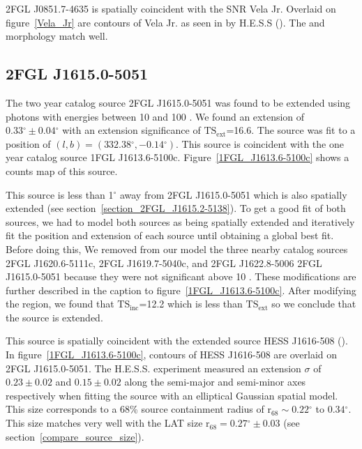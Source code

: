 \documentclass[12pt,preprint]{aastex}
\newcommand{\gev}{\text{GeV}\xspace}
\newcommand{\tev}{\text{TeV}\xspace}
\newcommand{\tsext}{{\ensuremath{\text{TS}_\text{ext}}}\xspace}
\newcommand{\tsinc}{\ensuremath{\text{TS}_\text{inc}}\xspace}
\newcommand{\rsixeight}{{\ensuremath{\text{r}_{68}}}\xspace}
\renewcommand{\deg}{\ensuremath{^\circ}\xspace}
\begin{document}
2FGL J0851.7-4635 is spatially coincident with the SNR Vela Jr.  Overlaid
on figure~\ref{Vela_Jr} are contours of Vela Jr. as seen in \tev by
H.E.S.S (\cite{vela_jr_hess}).  The \gev and \tev morphology match well.


\subsection{2FGL J1615.0-5051}
\label{section_2FGL_J1615.0-5051}


The two year catalog source 2FGL J1615.0-5051 was found to be
extended using photons with energies between 10 \gev and 100 \gev.
We found an extension of $0.33\deg\pm0.04\deg$ with an extension
significance of \tsext=16.6.  The source was fit to a position of
$(l,b)=(332.38\deg,-0.14\deg)$.  This source is coincident with the one
year catalog source 1FGL J1613.6-5100c.  Figure~\ref{1FGL_J1613.6-5100c}
shows a counts map of this source.

This source is less than 1\deg away from 2FGL J1615.0-5051 which is
also spatially extended (see section~\ref{section_2FGL_J1615.2-5138}).
To get a good fit of both sources, we had to model both sources as being
spatially extended and iteratively fit the position and extension of each
source until obtaining a global best fit.  Before doing this, We removed
from our model the three nearby catalog sources 2FGL J1620.6-5111c, 2FGL
J1619.7-5040c, and 2FGL J1622.8-5006 2FGL J1615.0-5051 because they were
not significant above 10 \gev.  These modifications are further described
in the caption to figure~\ref{1FGL_J1613.6-5100c}.  After modifying
the region, we found that \tsinc=12.2 which is less than \tsext so we
conclude that the source is extended.

This source is spatially coincident with the extended \tev source HESS
J1616-508 (\cite{HESS_plane_survey}).  In figure~\ref{1FGL_J1613.6-5100c},
contours of HESS J1616-508 are overlaid on 2FGL J1615.0-5051.  The
H.E.S.S. experiment measured an extension $\sigma$ of $0.23\pm0.02$ and
$0.15\pm0.02$ along the semi-major and semi-minor axes respectively when
fitting the source with an elliptical Gaussian spatial model.  This size
corresponds to a 68\% source containment radius of $\rsixeight\sim0.22\deg$
to $0.34\deg$. This size matches very well with the LAT size
$\rsixeight=0.27\deg\pm0.03$ (see section~\ref{compare_source_size}).
\end{document}
